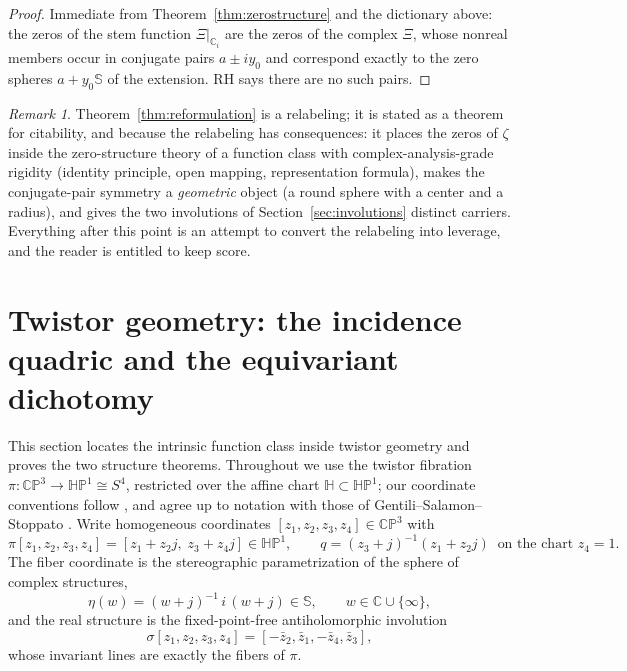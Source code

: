 \documentclass[11pt]{amsart}
\theoremstyle{plain}
\theoremstyle{definition}
\theoremstyle{remark}
\newtheorem{remark}[theorem]{Remark}
\newcommand{\HH}{\mathbb{H}}
\newcommand{\CC}{\mathbb{C}}
\newcommand{\CP}{\mathbb{CP}}
\newcommand{\HP}{\mathbb{HP}}
\renewcommand{\SS}{\mathbb{S}}
\begin{document}
\begin{proof}
Immediate from Theorem~\ref{thm:zerostructure} and the dictionary above: the zeros of the stem
function $\Xi|_{\CC_i}$ are the zeros of the complex $\Xi$, whose nonreal members occur in
conjugate pairs $a\pm iy_0$ and correspond exactly to the zero spheres $a+y_0\SS$ of the extension.
RH says there are no such pairs.
\end{proof}

\begin{remark}\label{rem:relabel}
Theorem~\ref{thm:reformulation} is a relabeling; it is stated as a theorem for citability, and
because the relabeling has consequences: it places the zeros of $\zeta$ inside the zero-structure
theory of a function class with complex-analysis-grade rigidity (identity principle, open mapping,
representation formula), makes the conjugate-pair symmetry a \emph{geometric} object (a round
sphere with a center and a radius), and gives the two involutions of Section~\ref{sec:involutions}
distinct carriers. Everything after this point is an attempt to convert the relabeling into
leverage, and the reader is entitled to keep score.
\end{remark}

\section{Twistor geometry: the incidence quadric and the equivariant dichotomy}\label{sec:twistor}

This section locates the intrinsic function class inside twistor geometry and proves the two
structure theorems. Throughout we use the twistor fibration
$\pi\colon\CP^3\to\HP^1\cong S^4$, restricted over the affine chart $\HH\subset\HP^1$; our
coordinate conventions follow \cite{Baker2017,Baker2023}, and agree up to notation with those of
Gentili--Salamon--Stoppato \cite{GSS2014}. Write homogeneous coordinates
$[z_1,z_2,z_3,z_4]\in\CP^3$ with
\[
\pi[z_1,z_2,z_3,z_4]=[z_1+z_2j,\;z_3+z_4j]\in\HP^1,\qquad
q=(z_3+j)^{-1}(z_1+z_2j)\ \text{ on the chart }z_4=1 .
\]
The fiber coordinate is the stereographic parametrization of the sphere of complex structures,
\[
\eta(w)=(w+j)^{-1}\,i\,(w+j)\in\SS,\qquad w\in\CC\cup\{\infty\},
\]
and the real structure is the fixed-point-free antiholomorphic involution
\[
\sigma[z_1,z_2,z_3,z_4]=[-\bar z_2,\bar z_1,-\bar z_4,\bar z_3],
\]
whose invariant lines are exactly the fibers of $\pi$.
\end{document}

